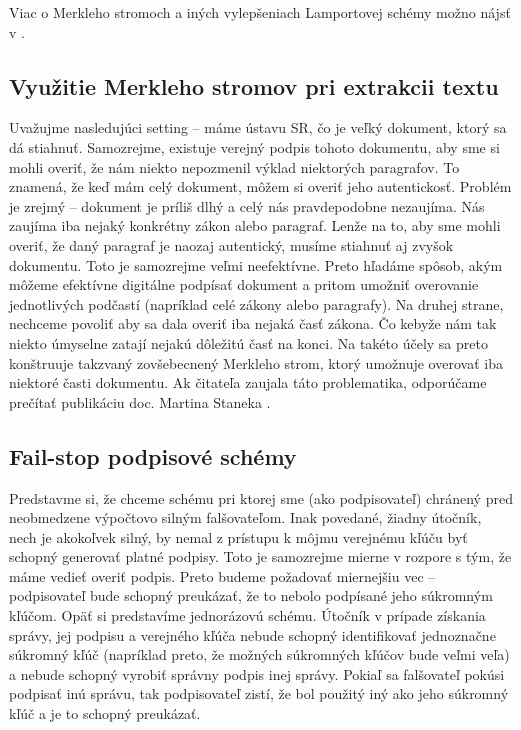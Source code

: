 Viac o Merkleho stromoch a iných vylepšeniach Lamportovej schémy
možno nájsť v \cite{merkle}.

\subsection{Využitie Merkleho stromov pri extrakcii textu}

Uvažujme nasledujúci setting -- máme ústavu SR, čo je veľký dokument, ktorý
sa dá stiahnuť. Samozrejme, existuje verejný podpis tohoto dokumentu, aby
sme si mohli overiť, že nám niekto nepozmenil výklad niektorých paragrafov.
To znamená, že keď mám celý dokument, môžem si overiť jeho autentickosť.
Problém je zrejmý -- dokument je príliš dlhý a celý nás pravdepodobne
nezaujíma. Nás zaujíma iba nejaký konkrétny zákon alebo paragraf. Lenže na
to, aby sme mohli overiť, že daný paragraf je naozaj autentický, musíme
stiahnuť aj zvyšok dokumentu. Toto je samozrejme veľmi neefektívne. Preto
hľadáme spôsob, akým môžeme efektívne digitálne podpísať dokument a pritom
umožniť overovanie jednotlivých podčastí (napríklad celé zákony alebo
paragrafy). Na druhej strane, nechceme povoliť aby sa dala overiť iba
nejaká časť zákona. Čo kebyže nám tak niekto úmyselne zatají nejakú
dôležitú časť na konci. Na takéto účely sa preto konštruuje takzvaný
zovšebecnený Merkleho strom, ktorý umožnuje overovať iba niektoré
časti dokumentu.
Ak čitateľa zaujala táto problematika, odporúčame prečítať publikáciu
doc. Martina Staneka \cite{stanek}.

\subsection{Fail-stop podpisové schémy}

Predstavme si, že chceme schému pri ktorej sme (ako podpisovateľ) chránený pred neobmedzene výpočtovo silným
falšovateľom. Inak povedané, žiadny útočník, nech je akokoľvek silný,
by nemal z prístupu k môjmu verejnému kľúču byť schopný generovať
platné podpisy. Toto je samozrejme mierne v rozpore s tým, že máme
vedieť overiť podpis. Preto budeme požadovať miernejšiu vec --
podpisovateľ bude schopný preukázať, že to nebolo podpísané jeho
súkromným kľúčom.
Opäť si predstavíme jednorázovú schému. Útočník v prípade získania
správy, jej podpisu a verejného kľúča nebude schopný identifikovať
jednoznačne súkromný kľúč (napríklad preto, že možných súkromných
kľúčov bude veľmi veľa)
a nebude schopný vyrobiť správny podpis inej správy.
Pokiaľ sa falšovateľ pokúsi podpisať inú správu, tak podpisovateľ zistí, že bol použitý iný
ako jeho súkromný kľúč a je to schopný preukázať.

